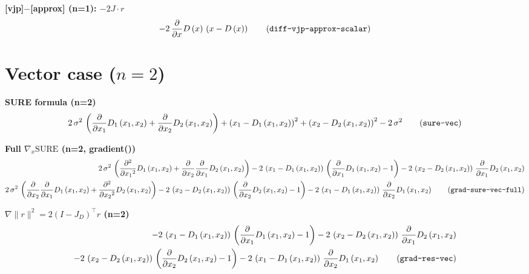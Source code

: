 \documentclass{article}
\begin{document}
\noindent\textbf{[vjp]$-$[approx]  (n=1):  $-2J \cdot r$}
\begin{align}
  -2\,\frac{\partial }{\partial x} D\left(x\right)\,\left(x-D\left(x\right)\right) \tag{\texttt{diff-vjp-approx-scalar}}
\end{align}

\section{Vector case ($n=2$)}

\noindent\textbf{SURE formula  (n=2)}
\begin{align}
  2\,\sigma ^2\,\left(\frac{\partial }{\partial x_{1}} D_{1}\left(x_{1},x_{2}\right)+\frac{\partial }{\partial x_{2}} D_{2}\left(x_{1},x_{2}\right)\right)+{\left(x_{1}-D_{1}\left(x_{1},x_{2}\right)\right)}^2+{\left(x_{2}-D_{2}\left(x_{1},x_{2}\right)\right)}^2-2\,\sigma ^2 \tag{\texttt{sure-vec}}
\end{align}

\noindent\textbf{Full $\nabla_x \mathrm{SURE}$  (n=2, gradient())}
\begin{align}
  2\,\sigma ^2\,\left(\frac{\partial ^2}{\partial {x_{1}}^2} D_{1}\left(x_{1},x_{2}\right)+\frac{\partial }{\partial x_{2}} \frac{\partial }{\partial x_{1}} D_{2}\left(x_{1},x_{2}\right)\right)-2\,\left(x_{1}-D_{1}\left(x_{1},x_{2}\right)\right)\,\left(\frac{\partial }{\partial x_{1}} D_{1}\left(x_{1},x_{2}\right)-1\right)-2\,\left(x_{2}-D_{2}\left(x_{1},x_{2}\right)\right)\,\frac{\partial }{\partial x_{1}} D_{2}\left(x_{1},x_{2}\right) \\
  2\,\sigma ^2\,\left(\frac{\partial }{\partial x_{2}} \frac{\partial }{\partial x_{1}} D_{1}\left(x_{1},x_{2}\right)+\frac{\partial ^2}{\partial {x_{2}}^2} D_{2}\left(x_{1},x_{2}\right)\right)-2\,\left(x_{2}-D_{2}\left(x_{1},x_{2}\right)\right)\,\left(\frac{\partial }{\partial x_{2}} D_{2}\left(x_{1},x_{2}\right)-1\right)-2\,\left(x_{1}-D_{1}\left(x_{1},x_{2}\right)\right)\,\frac{\partial }{\partial x_{2}} D_{1}\left(x_{1},x_{2}\right)
  \tag{\texttt{grad-sure-vec-full}}
\end{align}

\noindent\textbf{$\nabla\|r\|^2 = 2(I-J_D)^\top r$  (n=2)}
\begin{align}
  -2\,\left(x_{1}-D_{1}\left(x_{1},x_{2}\right)\right)\,\left(\frac{\partial }{\partial x_{1}} D_{1}\left(x_{1},x_{2}\right)-1\right)-2\,\left(x_{2}-D_{2}\left(x_{1},x_{2}\right)\right)\,\frac{\partial }{\partial x_{1}} D_{2}\left(x_{1},x_{2}\right) \\
  -2\,\left(x_{2}-D_{2}\left(x_{1},x_{2}\right)\right)\,\left(\frac{\partial }{\partial x_{2}} D_{2}\left(x_{1},x_{2}\right)-1\right)-2\,\left(x_{1}-D_{1}\left(x_{1},x_{2}\right)\right)\,\frac{\partial }{\partial x_{2}} D_{1}\left(x_{1},x_{2}\right)
  \tag{\texttt{grad-res-vec}}
\end{align}
\end{document}
